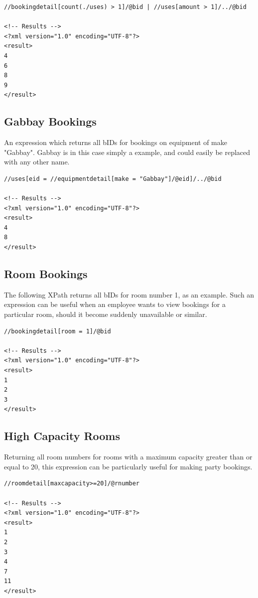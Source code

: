 \documentclass[a4paper, titlepage]{article}
\begin{document}
\begin{verbatim}
//bookingdetail[count(./uses) > 1]/@bid | //uses[amount > 1]/../@bid

<!-- Results -->
<?xml version="1.0" encoding="UTF-8"?>
<result>
4
6
8
9
</result>
\end{verbatim}

\subsection{Gabbay Bookings} \label{xpth:gabbay}

An expression which returns all bIDs for bookings on equipment of make "Gabbay". Gabbay is in this case simply a example, and could easily be replaced with any other name.

\begin{verbatim}
//uses[eid = //equipmentdetail[make = "Gabbay"]/@eid]/../@bid

<!-- Results -->
<?xml version="1.0" encoding="UTF-8"?>
<result>
4
8
</result>
\end{verbatim}

\subsection{Room Bookings} \label{xpth:roombooking}

The following XPath returns all bIDs for room number 1, as an example. 
Such an expression can be useful when an employee wants to view bookings for a particular room, should it become suddenly unavailable or similar.

\begin{verbatim}
//bookingdetail[room = 1]/@bid

<!-- Results -->
<?xml version="1.0" encoding="UTF-8"?>
<result>
1
2
3
</result>
\end{verbatim}

\subsection{High Capacity Rooms} \label{xpth:hicap}

Returning all room numbers for rooms with a maximum capacity greater than or equal to 20, this expression can be particularly useful for making party bookings.

\begin{verbatim}
//roomdetail[maxcapacity>=20]/@rnumber

<!-- Results -->
<?xml version="1.0" encoding="UTF-8"?>
<result>
1
2
3
4
7
11
</result>
\end{verbatim}
\end{document}

